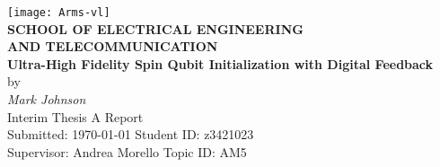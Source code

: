 \begin{center}
	\centering\texttt{[image: Arms-vl]}\\
	[0.5cm]
\textbf{\large SCHOOL OF ELECTRICAL ENGINEERING\\
AND TELECOMMUNICATION}\\[2cm]
{\addtolength{\baselineskip}{0.5cm}
\textbf{\Huge
Ultra-High Fidelity Spin Qubit Initialization with Digital Feedback} \\[0.5cm]
}
{\Large by}\\[0.5cm]
\textit{\huge
Mark Johnson} \\[1.5cm]
{\Large
Interim Thesis A Report\\[2ex]
\vfill
Submitted: \today\hfill
Student ID: z3421023\\[-1.0ex]
Supervisor: Andrea Morello\hfill
Topic ID: AM5\\
\vspace*{-1cm}
}
\end{center}